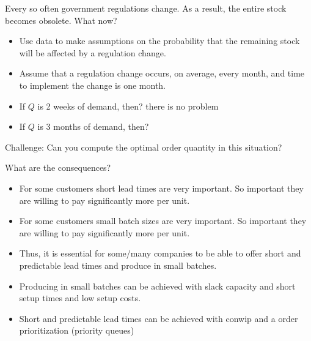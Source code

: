 \begin{question}
Every so often government regulations change. As a result, the entire
stock becomes obsolete. What now?
\begin{solution}
  \begin{itemize}
  \item Use data to make assumptions on the probability that the
    remaining stock will be affected by a regulation change.
  \item Assume that a regulation change occurs, on average, every
    month, and time to implement the change is one month.
  \item If  $Q$ is 2 weeks of demand, then?  there is no problem
  \item If $Q$ is 3 months of demand, then? 
  \end{itemize}
Challenge: Can you compute the optimal order quantity in this situation? 






What are the consequences?

  \begin{itemize}
    \item For some customers short lead times are very important. So important
      they are willing to pay significantly more per unit.
    \item For some customers small batch sizes are very important. So
      important they are willing to pay significantly more per unit.
    \item Thus,  it is essential for some/many companies to be
      able to offer short and predictable lead times and produce in
      small batches.
    \item Producing in small batches can be achieved with slack capacity and short setup times and low setup costs.
    \item Short and predictable lead times can be achieved with conwip
      and a order prioritization (priority queues)
  \end{itemize}
\end{solution}
\end{question}
